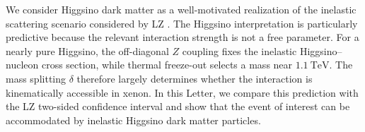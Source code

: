 \documentclass[
aps,
prl,
reprint,
superscriptaddress,
nofootinbib,
nobibnotes
]{revtex4-2}
\begin{document}
We consider Higgsino dark matter as a well-motivated realization of the inelastic scattering scenario considered by LZ \cite{LZ:2026, Graham:2024syw}.
The Higgsino interpretation is particularly predictive because the relevant interaction strength is not a free parameter. For a nearly pure Higgsino, the off-diagonal $Z$ coupling fixes the inelastic Higgsino--nucleon cross section, while thermal freeze-out selects a mass near $1.1~\mathrm{TeV}$. The mass splitting $\delta$ therefore largely determines whether the interaction is kinematically accessible in xenon. In this Letter, we compare this prediction with the LZ two-sided confidence interval and show that the event of interest can be accommodated by  inelastic Higgsino dark matter particles.
\end{document}
